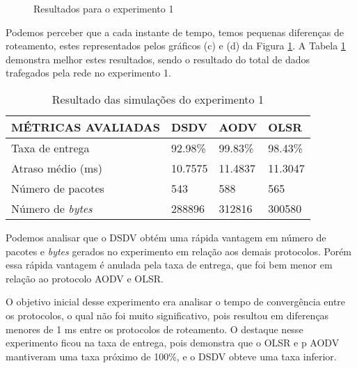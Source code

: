 \begin{figure}[H]
	\centering
	\label{subfig:exp1Lost}
	\label{subfig:exp1Late}
	\label{subfig:exp1Byte}
	\label{subfig:exp1Pkts}
	
	\caption{Resultados para o experimento 1}
	\label{fig:resulExp1}
\end{figure}

Podemos perceber que a cada instante de tempo, temos pequenas diferen\c{c}as de roteamento, estes representados pelos gr\'aficos (c) e (d) da Figura \ref{fig:resulExp1}. A Tabela \ref{tabExp1Result} demonstra melhor estes resultados, sendo o resultado do total de dados trafegados pela rede no experimento 1.

\begin{table}[H]
	\centering
	\caption{Resultado das simula\c{c}\~oes do experimento 1}
	\begin{tabular}{ | l | l | l | l | }
		\hline
		M\'ETRICAS AVALIADAS & DSDV & AODV & OLSR \\ \hline
		Taxa de entrega & 92.98\% & 99.83\% & 98.43\% \\ \hline
		Atraso m\'edio (ms) & 10.7575 & 11.4837 & 11.3047 \\ \hline
		N\'umero de pacotes & 543 & 588 & 565 \\ \hline
		N\'umero de \textit{bytes} & 288896 & 312816 & 300580 \\ \hline
	\end{tabular}
	\label{tabExp1Result}
\end{table}

Podemos analisar que o DSDV obt\'em uma r\'apida vantagem em n\'umero de pacotes e \textit{bytes} gerados no experimento em rela\c{c}\~ao aos demais protocolos. Por\'em essa r\'apida vantagem \'e anulada pela taxa de entrega, que foi bem menor em rela\c{c}\~ao ao protocolo AODV e OLSR.

O objetivo inicial desse experimento era analisar o tempo de converg\^encia entre os protocolos, o qual n\~ao foi muito significativo, pois resultou em diferen\c{c}as menores de 1 ms entre os protocolos de roteamento. 
O destaque nesse experimento ficou na taxa de entrega, pois demonstra que o OLSR e p AODV mantiveram uma taxa pr\'oximo de 100\%, e o DSDV obteve uma taxa inferior.

